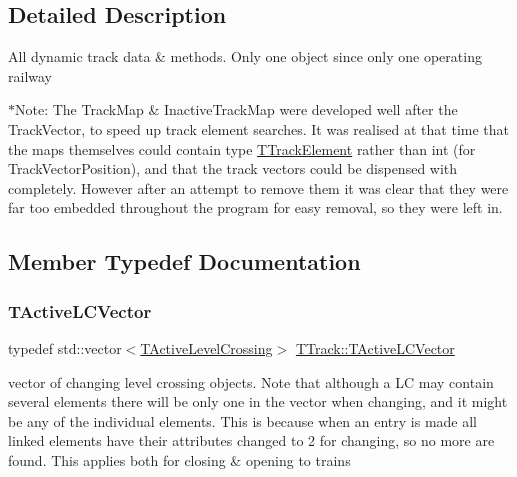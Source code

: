 \subsection{Detailed Description}
All dynamic track data \& methods. Only one object since only one operating railway

$\ast$\+Note\+: The Track\+Map \& Inactive\+Track\+Map were developed well after the Track\+Vector, to speed up track element searches. It was realised at that time that the maps themselves could contain type \mbox{\hyperlink{class_t_track_element}{T\+Track\+Element}} rather than int (for Track\+Vector\+Position), and that the track vectors could be dispensed with completely. However after an attempt to remove them it was clear that they were far too embedded throughout the program for easy removal, so they were left in. 

\subsection{Member Typedef Documentation}
\mbox{\label{class_t_track_af124e944cfb44075f390cf5eceaf3e66}} 
\subsubsection{\texorpdfstring{T\+Active\+L\+C\+Vector}{TActiveLCVector}}
{\footnotesize\ttfamily typedef std\+::vector$<$\mbox{\hyperlink{class_t_track_1_1_t_active_level_crossing}{T\+Active\+Level\+Crossing}}$>$ \mbox{\hyperlink{class_t_track_af124e944cfb44075f390cf5eceaf3e66}{T\+Track\+::\+T\+Active\+L\+C\+Vector}}}

vector of changing level crossing objects. Note that although a LC may contain several elements there will be only one in the vector when changing, and it might be any of the individual elements. This is because when an entry is made all linked elements have their attributes changed to 2 for changing, so no more are found. This applies both for closing \& opening to trains \mbox{\label{class_t_track_af78e1d88c49cebd05b35fc408a5d9d2e}} 
